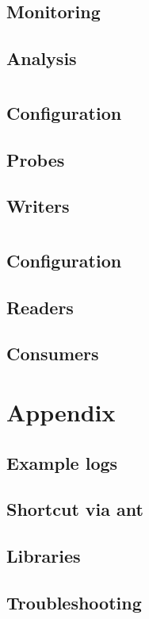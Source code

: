 \documentclass[a4paper, oneside, 11pt]{scrartcl}
\begin{document}
\subsection{Monitoring}
\subsection{Analysis}

\section{\KiekerMonitoring}
\subsection{Configuration}
\subsection{Probes}
\subsection{Writers}

\section{\KiekerAnalysis}
\subsection{Configuration}
\subsection{Readers}
\subsection{Consumers}

\section{Appendix}
\subsection{Example logs}
\subsection{Shortcut via ant}
\subsection{Libraries}

\subsection{Troubleshooting}
\end{document}
